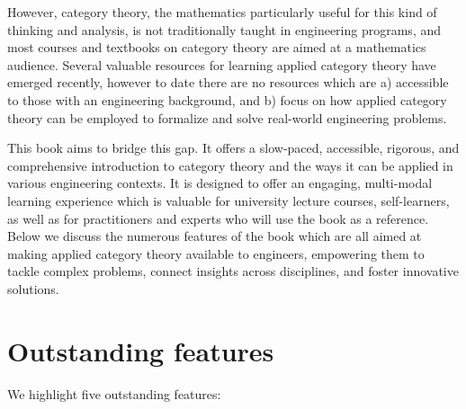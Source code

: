 \documentclass[10pt, article, one side]{memoir}
\begin{document}
        However, category theory, the mathematics particularly useful for this kind of thinking and analysis, is not traditionally taught in engineering programs, and most courses and textbooks on category theory are aimed at a mathematics audience. Several valuable resources for learning applied category theory have emerged recently, however to date there are no resources which are a) accessible to those with an engineering background, and b) focus on how applied category theory can be employed to formalize and solve real-world engineering problems.
        
        This book aims to bridge this gap. It offers a slow-paced, accessible, rigorous, and comprehensive introduction to category theory and the ways it can be applied in various engineering contexts. It is designed to offer an engaging, multi-modal learning experience which is valuable for university lecture courses, self-learners, as well as for practitioners and experts who will use the book as a reference. Below we discuss the numerous features of the book which are all aimed at making applied category theory available to engineers, empowering them to tackle complex problems, connect insights across disciplines, and foster innovative solutions.

    \section{Outstanding features}
   We highlight five outstanding features:
   
\end{document}
